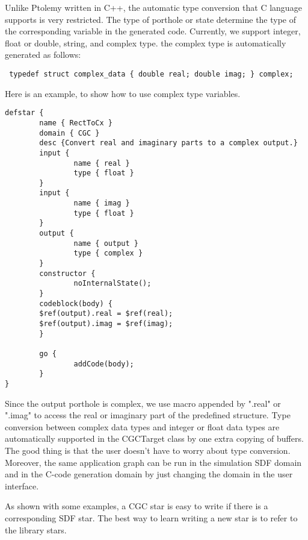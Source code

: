 \begin{ignore}
Unlike Ptolemy written in C++, the automatic 
type conversion that C language supports is very restricted.
The type of porthole or state determine the type of the
corresponding variable in the generated code. Currently, we
support integer, float or double, string, and complex type.
the complex type is automatically generated as follows:

\begin{verbatim}
 typedef struct complex_data { double real; double imag; } complex;
\end{verbatim}

Here is an example,
to show how to use complex type variables.

\begin{verbatim}
defstar {
        name { RectToCx }
        domain { CGC }
        desc {Convert real and imaginary parts to a complex output.}
        input {
                name { real }
                type { float }
        }
        input {
                name { imag }
                type { float }
        }
        output {
                name { output }
                type { complex }
        }
        constructor {
                noInternalState();
        }
        codeblock(body) {
        $ref(output).real = $ref(real);
        $ref(output).imag = $ref(imag);
        }
        
        go {
                addCode(body);
        }
}
\end{verbatim}

Since the output porthole is complex, we use
macro appended by ".real" or ".imag" to access the real or imaginary
part of the predefined  structure.
Type conversion between complex data types and integer or float data
types are automatically supported in the CGCTarget class by one extra
copying of buffers. The good thing is that the user doesn't have to
worry about type conversion. Moreover, the same application graph
can be run in the simulation SDF domain and in the C-code
generation domain by just changing the domain in the user interface.

As shown with some examples, a CGC star is easy to write if there
is a corresponding SDF star. The best way to learn writing a new
star is to refer to the library stars.


\end{ignore}
